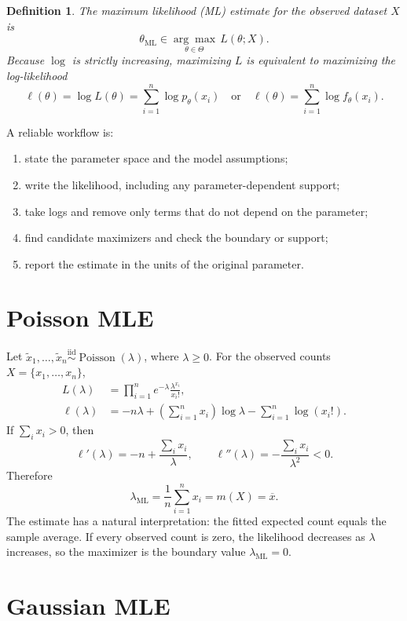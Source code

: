 \documentclass[11pt]{article}
\newcommand{\iid}{\mathrel{\overset{\mathrm{iid}}{\sim}}}
\newcommand{\MLE}{\mathrm{ML}}
\newcommand{\rv}[1]{\widetilde{#1}}
\newtheorem*{definition}{Definition}
\begin{document}
\begin{definition}
The maximum likelihood (ML) estimate for the observed dataset $X$ is
\[
  \theta_{\MLE}
  \in \underset{\theta\in\Theta}{\arg\max}\,L(\theta;X).
\]
Because $\log$ is strictly increasing, maximizing $L$ is equivalent to
maximizing the log-likelihood
\[
  \ell(\theta)=\log L(\theta)=\sum_{i=1}^n \log p_\theta(x_i)
  \quad\text{or}\quad
  \ell(\theta)=\sum_{i=1}^n \log f_\theta(x_i).
\]
\end{definition}

\noindent A reliable workflow is:
\begin{enumerate}[label=\arabic*.,leftmargin=2em,itemsep=0.2em]
  \item state the parameter space and the model assumptions;
  \item write the likelihood, including any parameter-dependent support;
  \item take logs and remove only terms that do not depend on the parameter;
  \item find candidate maximizers and check the boundary or support;
  \item report the estimate in the units of the original parameter.
\end{enumerate}

\section{Poisson MLE}

Let $\rv{x}_1,\ldots,\rv{x}_n\iid\operatorname{Poisson}(\lambda)$, where
$\lambda\geq 0$. For the observed counts
$X=\{x_1,\ldots,x_n\}$,
\begin{align*}
  L(\lambda)
  &=\prod_{i=1}^n e^{-\lambda}\frac{\lambda^{x_i}}{x_i!},\\
  \ell(\lambda)
  &=-n\lambda+\left(\sum_{i=1}^n x_i\right)\log\lambda
    -\sum_{i=1}^n\log(x_i!).
\end{align*}
If $\sum_i x_i>0$, then
\[
  \ell'(\lambda)=-n+\frac{\sum_i x_i}{\lambda},
  \qquad
  \ell''(\lambda)=-\frac{\sum_i x_i}{\lambda^2}<0.
\]
Therefore
\[
  \boxed{\lambda_{\MLE}=\frac{1}{n}\sum_{i=1}^n x_i=m(X)=\overline x.}
\]
The estimate has a natural interpretation: the fitted expected count equals
the sample average. If every observed count is zero, the likelihood decreases
as $\lambda$ increases, so the maximizer is the boundary value
$\lambda_{\MLE}=0$.

\section{Gaussian MLE}
\end{document}
